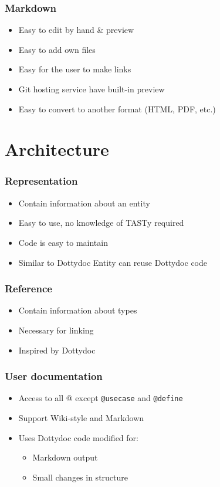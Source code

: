 \documentclass{beamer}
\begin{document}
\begin{frame}
  \frametitle{Markdown}
  \begin{itemize}
    \item Easy to edit by hand \& preview \pause
    \item Easy to add own files \pause
    \item Easy for the user to make links \pause
    \item Git hosting service have built-in preview \pause
    \item Easy to convert to another format (HTML, PDF, etc.)
  \end{itemize}
\end{frame}

\section{Architecture}

\begin{frame}
  \frametitle{Representation}
  \begin{itemize}
    \item Contain information about an entity \pause
    \item Easy to use, no knowledge of TASTy required \pause
    \item Code is easy to maintain \pause
    \item Similar to Dottydoc Entity \textrightarrow can reuse Dottydoc code
  \end{itemize}
\end{frame}

\begin{frame}
  \frametitle{Reference}
  \begin{itemize}
    \item Contain information about types \pause
    \item Necessary for linking \pause
    \item Inspired by Dottydoc
  \end{itemize}
\end{frame}

\begin{frame}[fragile]
  \frametitle{User documentation}
  \begin{itemize}
    \item Access to all @ except \texttt{@usecase} and \texttt{@define}\pause
    \item Support Wiki-style and Markdown \pause
    \item Uses Dottydoc code modified for:
    \begin{itemize}
      \item Markdown output
      \item Small changes in structure 
    \end{itemize}
  \end{itemize}
\end{frame}
\end{document}
